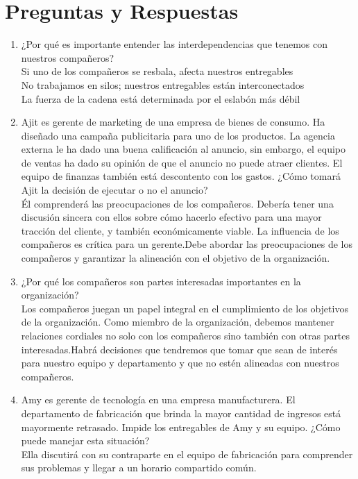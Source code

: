 \documentclass[10pt]{book}
\begin{document}
\section{Preguntas y Respuestas}
\begin{enumerate}[\bfseries 1.]
\item ¿Por qué es importante entender las interdependencias que tenemos con nuestros compañeros?\\
Si uno de los compañeros se resbala, afecta nuestros entregables\\
No trabajamos en silos; nuestros entregables están interconectados\\
La fuerza de la cadena está determinada por el eslabón más débil
\item Ajit es gerente de marketing de una empresa de bienes de consumo. Ha diseñado una campaña publicitaria para uno de los productos. La agencia externa le ha dado una buena calificación al anuncio, sin embargo, el equipo de ventas ha dado su opinión de que el anuncio no puede atraer clientes. El equipo de finanzas también está descontento con los gastos. ¿Cómo tomará Ajit la decisión de ejecutar o no el anuncio?\\
Él comprenderá las preocupaciones de los compañeros. Debería tener una discusión sincera con ellos sobre cómo hacerlo efectivo para una mayor tracción del cliente, y también económicamente viable. La influencia de los compañeros es crítica para un gerente.Debe abordar las preocupaciones de los compañeros y garantizar la alineación con el objetivo de la organización.
\item ¿Por qué los compañeros son partes interesadas importantes en la organización?\\
Los compañeros juegan un papel integral en el cumplimiento de los objetivos de la organización. Como miembro de la organización, debemos mantener relaciones cordiales no solo con los compañeros sino también con otras partes interesadas.Habrá decisiones que tendremos que tomar que sean de interés para nuestro equipo y departamento y que no estén alineadas con nuestros compañeros.
\item Amy es gerente de tecnología en una empresa manufacturera. El departamento de fabricación que brinda la mayor cantidad de ingresos está mayormente retrasado. Impide los entregables de Amy y su equipo. ¿Cómo puede manejar esta situación?\\
Ella discutirá con su contraparte en el equipo de fabricación para comprender sus problemas y llegar a un horario compartido común.

\end{enumerate}
\end{document}
